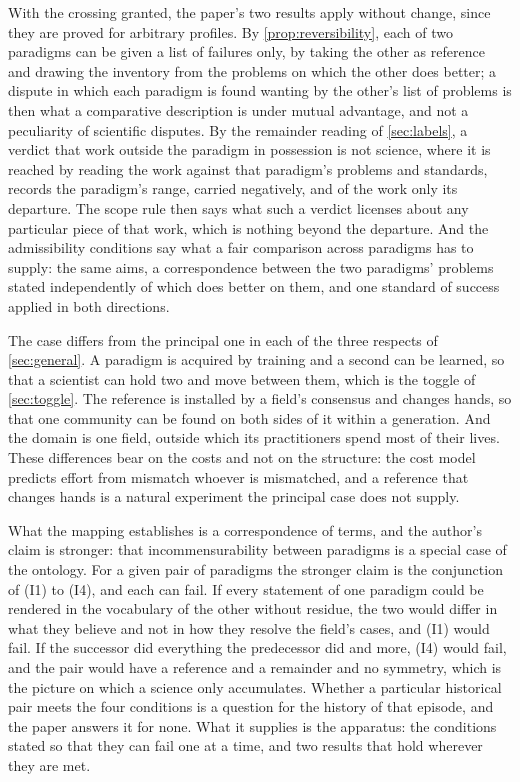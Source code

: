 With the crossing granted, the paper's two results apply without change, since they are proved for arbitrary profiles. By \autoref{prop:reversibility}, each of two paradigms can be given a list of failures only, by taking the other as reference and drawing the inventory from the problems on which the other does better; a dispute in which each paradigm is found wanting by the other's list of problems is then what a comparative description is under mutual advantage, and not a peculiarity of scientific disputes. By the remainder reading of \autoref{sec:labels}, a verdict that work outside the paradigm in possession is not science, where it is reached by reading the work against that paradigm's problems and standards, records the paradigm's range, carried negatively, and of the work only its departure. The scope rule then says what such a verdict licenses about any particular piece of that work, which is nothing beyond the departure. And the admissibility conditions say what a fair comparison across paradigms has to supply: the same aims, a correspondence between the two paradigms' problems stated independently of which does better on them, and one standard of success applied in both directions.

The case differs from the principal one in each of the three respects of \autoref{sec:general}. A paradigm is acquired by training and a second can be learned, so that a scientist can hold two and move between them, which is the toggle of \autoref{sec:toggle}. The reference is installed by a field's consensus and changes hands, so that one community can be found on both sides of it within a generation. And the domain is one field, outside which its practitioners spend most of their lives. These differences bear on the costs and not on the structure: the cost model predicts effort from mismatch whoever is mismatched, and a reference that changes hands is a natural experiment the principal case does not supply.

What the mapping establishes is a correspondence of terms, and the author's claim is stronger: that incommensurability between paradigms is a special case of the ontology. For a given pair of paradigms the stronger claim is the conjunction of (I1) to (I4), and each can fail. If every statement of one paradigm could be rendered in the vocabulary of the other without residue, the two would differ in what they believe and not in how they resolve the field's cases, and (I1) would fail. If the successor did everything the predecessor did and more, (I4) would fail, and the pair would have a reference and a remainder and no symmetry, which is the picture on which a science only accumulates. Whether a particular historical pair meets the four conditions is a question for the history of that episode, and the paper answers it for none. What it supplies is the apparatus: the conditions stated so that they can fail one at a time, and two results that hold wherever they are met.

